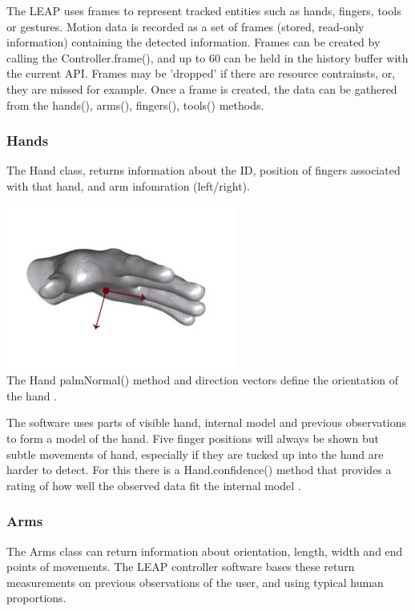 \documentclass[10pt]{article}
\begin{document}
The LEAP uses frames to represent tracked entities such as hands, fingers, tools or gestures. Motion data is recorded as a set of frames (stored, read-only information) containing the detected information. 
Frames can be created by calling the Controller.frame(), and up to 60 can be held in the history buffer with the current API. Frames may be 'dropped' if there are resource contrainsts, or, they are missed for example. Once a frame is created, the data can be gathered from the hands(), arms(), fingers(), tools() methods.

\subsubsection{Hands}
The Hand class, returns information about the ID, position of fingers associated with that hand, and arm infomration (left/right).

\begin{center}
\includegraphics[scale=0.6]{palm}\\
The Hand palmNormal() method and direction vectors define the orientation of the hand \cite{leap}.
\end{center}

The software uses parts of visible hand, internal model and previous observations to form a model of the hand. Five finger positions will always be shown but subtle movements of hand, especially if they are tucked up into the hand are harder to detect. For this there is a Hand.confidence() method that provides a rating of how well the observed data fit the internal model \cite{leap}.

\subsubsection{Arms}
The Arms class can return information about orientation, length, width and end points of movements. The LEAP controller software bases these return measurements on previous observations of the user, and using typical human proportions.
\end{document}
